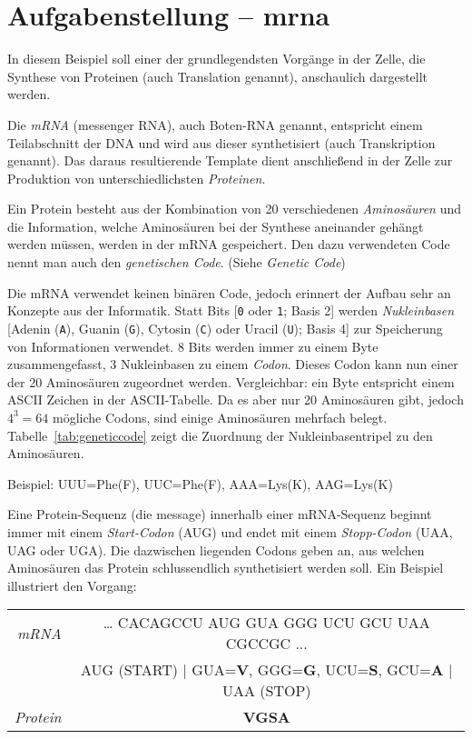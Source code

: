 
\usepackage{multirow}




\section*{Aufgabenstellung -- mrna}

In diesem Beispiel soll einer der grundlegendsten Vorgänge in der Zelle, die
Synthese von Proteinen (auch Translation genannt), anschaulich dargestellt
werden.

Die \emph{mRNA} (messenger RNA), auch Boten-RNA genannt, entspricht einem
Teilabschnitt der DNA und wird aus dieser synthetisiert (auch Transkription
genannt).  Das daraus resultierende Template dient anschließend in der Zelle
zur Produktion von unterschiedlichsten \emph{Proteinen}.

Ein Protein besteht aus der Kombination von 20 verschiedenen
\emph{Aminosäuren} und die Information, welche Aminosäuren bei der Synthese
aneinander gehängt werden müssen, werden in der mRNA gespeichert. Den dazu
verwendeten Code nennt man auch den \emph{genetischen Code}. (Siehe
\textit{Genetic Code})

Die mRNA verwendet keinen binären Code, jedoch erinnert der Aufbau sehr an
Konzepte aus der Informatik. Statt Bits [\verb|0| oder \verb|1|; Basis 2]
werden \emph{Nukleinbasen} [Adenin (\verb|A|), Guanin (\verb|G|), Cytosin
(\verb|C|) oder Uracil (\verb|U|); Basis 4] zur Speicherung von Informationen
verwendet. 8 Bits werden immer zu einem Byte zusammengefasst, 3 Nukleinbasen zu
einem \emph{Codon}. Dieses Codon kann nun einer der 20 Aminosäuren zugeordnet
werden. Vergleichbar: ein Byte entspricht einem ASCII Zeichen in der
ASCII-Tabelle. Da es aber nur 20 Aminosäuren gibt, jedoch $4^3=64$ mögliche
Codons, sind einige Aminosäuren mehrfach belegt.
Tabelle~\ref{tab:geneticcode} zeigt die Zuordnung der Nukleinbasentripel
zu den Aminosäuren.

Beispiel: UUU=Phe(F), UUC=Phe(F), AAA=Lys(K), AAG=Lys(K)

Eine Protein-Sequenz (die message) innerhalb einer mRNA-Sequenz beginnt immer
mit einem \emph{Start-Codon} (AUG) und endet mit einem \emph{Stopp-Codon}
(UAA, UAG oder UGA). Die dazwischen liegenden Codons geben an, aus welchen
Aminosäuren das Protein schlussendlich synthetisiert werden soll. Ein
Beispiel illustriert den Vorgang:

\renewcommand{\arraystretch}{1.4}
\begin{center}
\begin{tabular}{r c}
\textit{mRNA} & … CACAGCCU AUG GUA GGG UCU GCU UAA CGCCGC ... \\
 & AUG (START) | GUA=\textbf{V}, GGG=\textbf{G}, UCU=\textbf{S}, GCU=\textbf{A} | UAA (STOP) \\
\textit{Protein} & \textbf{VGSA}
\end{tabular}
\end{center}


